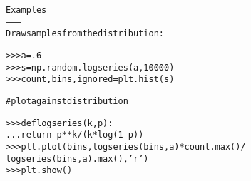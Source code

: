 \begin{boxedminipage}{\funcwidth}
\begin{alltt}
Examples
--------
Draw samples from the distribution:

{\textgreater}{\textgreater}{\textgreater} a = .6
{\textgreater}{\textgreater}{\textgreater} s = np.random.logseries(a, 10000)
{\textgreater}{\textgreater}{\textgreater} count, bins, ignored = plt.hist(s)

\#   plot against distribution

{\textgreater}{\textgreater}{\textgreater} def logseries(k, p):
...     return -p**k/(k*log(1-p))
{\textgreater}{\textgreater}{\textgreater} plt.plot(bins, logseries(bins, a)*count.max()/
             logseries(bins, a).max(), 'r')
{\textgreater}{\textgreater}{\textgreater} plt.show()
\end{alltt}

\setlength{\parskip}{1ex}
    \end{boxedminipage}

    \label{QSTK:qstklearn:mldiagnostics:multinomial}

    \vspace{0.5ex}

